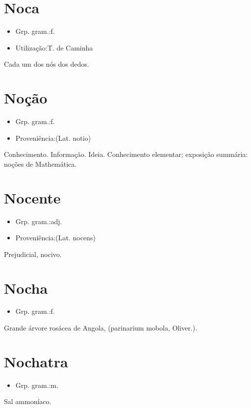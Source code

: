\section{Noca}
\begin{itemize}
\item {Grp. gram.:f.}
\end{itemize}
\begin{itemize}
\item {Utilização:T. de Caminha}
\end{itemize}
Cada um dos nós dos dedos.
\section{Noção}
\begin{itemize}
\item {Grp. gram.:f.}
\end{itemize}
\begin{itemize}
\item {Proveniência:(Lat. \textunderscore notio\textunderscore )}
\end{itemize}
Conhecimento.
Informação.
Ideia.
Conhecimento elementar; exposição summária: \textunderscore noções de Mathemática\textunderscore .
\section{Nocente}
\begin{itemize}
\item {Grp. gram.:adj.}
\end{itemize}
\begin{itemize}
\item {Proveniência:(Lat. \textunderscore nocens\textunderscore )}
\end{itemize}
Prejudicial, nocivo.
\section{Nocha}
\begin{itemize}
\item {Grp. gram.:f.}
\end{itemize}
Grande árvore rosácea de Angola, (\textunderscore parinarium mobola\textunderscore , Oliver.).
\section{Nochatra}
\begin{itemize}
\item {Grp. gram.:m.}
\end{itemize}
Sal ammoníaco.

